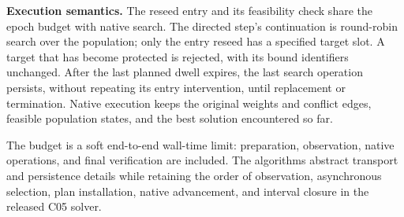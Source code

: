 \documentclass[10pt,a4paper]{article}
\begin{document}
\textbf{Execution semantics.}
The reseed entry and its feasibility check share the epoch budget with native
search. The directed step's continuation is round-robin search over the
population; only the entry reseed has a specified target slot. A target that
has become protected is rejected, with its bound identifiers unchanged.
After the last planned dwell expires, the last search operation persists,
without repeating its entry intervention, until replacement or termination.
Native execution keeps the original weights and conflict edges, feasible
population states, and the best solution encountered so far.

The budget is a soft end-to-end wall-time limit: preparation, observation,
native operations, and final verification are included. The algorithms
abstract transport and persistence details while retaining the order of
observation, asynchronous selection, plan installation, native advancement,
and interval closure in the released C05 solver.
\end{document}

